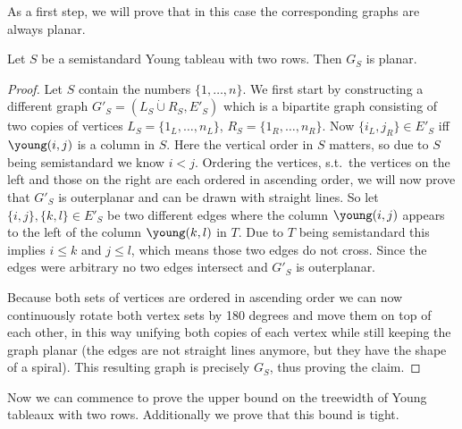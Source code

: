 As a first step, we will prove that in this case the corresponding graphs are always planar.
\begin{proposition}
    \label{prop:2rowplanar}
    Let $S$ be a semistandard Young tableau with two rows.
    Then $G_S$ is planar.
\end{proposition}
\begin{proof}
    Let $S$ contain the numbers $\{1, \ldots, n\}$.
    We first start by constructing a different graph $G'_S = (L_S \dot{\cup} R_S, E'_S)$ which is a bipartite graph consisting of two copies of vertices $L_S = \{1_L, \ldots, n_L\}$, $R_S = \{1_R, \ldots, n_R\}$.
    Now $\{i_L, j_R\} \in E'_S$ iff {\scriptsize $\young(i,j)$} is a column in $S$.
    Here the vertical order in $S$ matters, so due to $S$ being semistandard we know $i < j$.
    Ordering the vertices, s.t.\ the vertices on the left and those on the right are each ordered in ascending order, we will now prove that $G'_S$ is outerplanar and can be drawn with straight lines.
    So let $\{i,j\}, \{k,l\} \in E'_S$ be two different edges where the column {\scriptsize $\young(i,j)$} appears to the left of the column {\scriptsize $\young(k,l)$} in $T$.
    Due to $T$ being semistandard this implies $i \leq k$ and $j \leq l$, which means those two edges do not cross.
    Since the edges were arbitrary no two edges intersect and $G'_S$ is outerplanar.

    Because both sets of vertices are ordered in ascending order we can now continuously rotate both vertex sets by 180 degrees and move them on top of each other, in this way unifying both copies of each vertex while still keeping the graph planar (the edges are not straight lines anymore, but they have the shape of a spiral).
    This resulting graph is precisely $G_S$, thus proving the claim.
\end{proof}

Now we can commence to prove the upper bound on the treewidth of Young tableaux with two rows.
Additionally we prove that this bound is tight.

